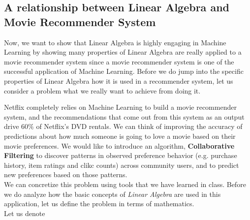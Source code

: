 \documentclass[paper=a4, fontsize=11pt]{scrartcl} %
\numberwithin{equation}{section} %
\numberwithin{figure}{section} %
\numberwithin{table}{section} %
\begin{document}
\subsection{A relationship between Linear Algebra and Movie Recommender System}

Now, we want to show that Linear Algebra is highly engaging in Machine Learning by showing many properties of Linear Algebra
are really applied to a movie recommender system
since a movie recommender system is one of the successful application of Machine Learning.
Before we do jump into the specific properties of Linear Algebra how it is used in a recommender system,
let us consider a problem what we really want to achieve from doing it.

\bigskip

Netflix completely relies on Machine Learning to build a movie recommender system, and
the recommendations that come out from this system as an output drive \(60\%\) of Netflix's DVD rentals.
We can think of improving the accuracy of predictions about
how much someone is going to love a movie based on their movie preferences.
We would like to introduce an algorithm, \textbf{Collaborative Filtering} to discover
patterns in observed preference behavior (e.g. purchase history, item ratings and clikc counts) across
community users, and to predict new preferences based on those patterns. \\

We can concretize this problem using tools that we have learned in class.
Before we do analyze how the basic concepts of \textit{Linear Algebra} are used in this application,
let us define the problem in terms of mathematics. \\

Let us denote
\end{document}
